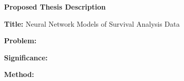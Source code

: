 \documentclass[12pt]{article}
\begin{document}
\begin{center}
\end{center} 
\vspace{10pt} 

\textbf{Proposed Thesis Description}  
\vspace{10pt} 

\textbf{Title:} Neural Network Models of Survival Analysis Data
\vspace{10pt}

\textbf{Problem:}
\vspace{10pt}

\textbf{Significance:}
\vspace{10pt}

\textbf{Method:}
\end{document}
